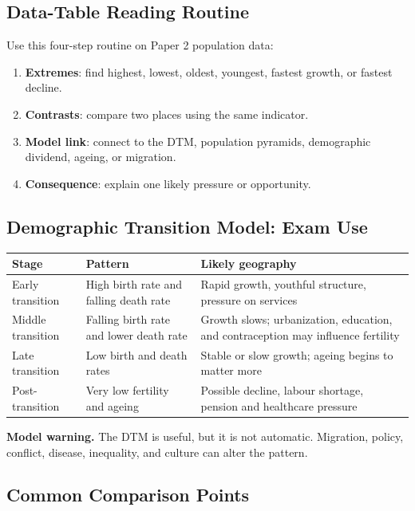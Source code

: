 \documentclass[11pt,a4paper]{article}
\newcommand{\term}[1]{\textcolor{HeadingBlue}{\textbf{#1}}}
\newcommand{\boxnote}[3]{%
\noindent\colorbox{#1}{%
  \begin{minipage}{0.965\textwidth}
  \sffamily
  \textbf{\textcolor{HeadingBlue}{#2}} #3
  \end{minipage}
}}
\begin{document}
\subsection{Data-Table Reading Routine}

Use this four-step routine on Paper 2 population data:

\begin{enumerate}
  \item \term{Extremes}: find highest, lowest, oldest, youngest, fastest
  growth, or fastest decline.
  \item \term{Contrasts}: compare two places using the same indicator.
  \item \term{Model link}: connect to the DTM, population pyramids,
  demographic dividend, ageing, or migration.
  \item \term{Consequence}: explain one likely pressure or opportunity.
\end{enumerate}

\subsection{Demographic Transition Model: Exam Use}

\begin{tabularx}{\textwidth}{L{0.18\textwidth}Y Y}
\toprule
\textbf{Stage} & \textbf{Pattern} & \textbf{Likely geography} \\
\midrule
Early transition & High birth rate and falling death rate & Rapid growth,
youthful structure, pressure on services \\
Middle transition & Falling birth rate and lower death rate & Growth slows;
urbanization, education, and contraception may influence fertility \\
Late transition & Low birth and death rates & Stable or slow growth; ageing
begins to matter more \\
Post-transition & Very low fertility and ageing & Possible decline, labour
shortage, pension and healthcare pressure \\
\bottomrule
\end{tabularx}

\boxnote{SoftTint}{Model warning.}{The DTM is useful, but it is not automatic.
Migration, policy, conflict, disease, inequality, and culture can alter the
pattern.}

\subsection{Common Comparison Points}
\end{document}
